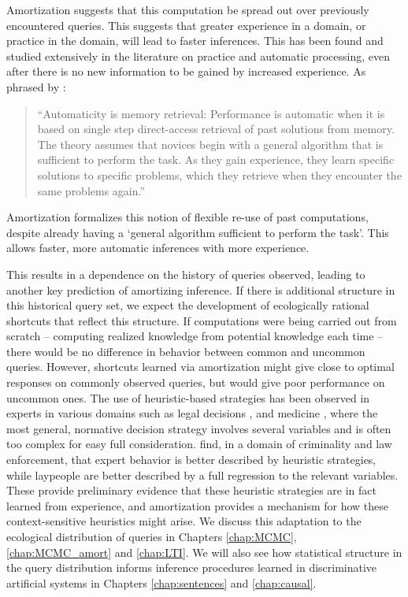 Amortization suggests that this computation be spread out over previously encountered queries. This suggests that greater experience in a domain, or practice in the domain, will lead to faster inferences. This has been found and studied extensively in the literature on practice\citep{gobet2001chunking, newell1981mechanisms} and automatic processing\citep{shiffrin1977controlled, logan1988toward}, even after there is no new information to be gained by increased experience. As phrased by \citet{logan1988toward}:
\begin{quote}
``Automaticity is memory retrieval: Performance is automatic when it is based on single step direct-access retrieval of past solutions from memory. The theory assumes that novices begin with a general algorithm that is sufficient to perform the task. As they gain experience, they learn specific solutions to specific problems, which they retrieve when they encounter the same problems again.''
\end{quote}
Amortization formalizes this notion of flexible re-use of past computations, despite already having a `general algorithm sufficient to perform the task'. This allows faster, more automatic inferences with more experience.

This results in a dependence on the history of queries observed, leading to another key prediction of amortizing inference. If there is additional structure in this historical query set, we expect the development of ecologically rational shortcuts that reflect this structure.  If computations were being carried out from scratch -- computing realized knowledge from potential knowledge each time -- there would be no difference in behavior between common and uncommon queries. However, shortcuts learned via amortization might give close to optimal responses on commonly observed queries, but would give poor performance on uncommon ones. The use of heuristic-based strategies has been observed in experts in various domains such as legal decisions \citep{dhami2001bailing}, and medicine \citep{reyna2006physician}, where the most general, normative decision strategy involves several variables and is often too complex for easy full consideration. \citet{garcia2009take} find, in a domain of criminality and law enforcement, that expert behavior is better described by heuristic strategies, while laypeople are better described by a full regression to the relevant variables. These provide preliminary evidence that these heuristic strategies are in fact learned from experience, and amortization provides a mechanism for how these context-sensitive heuristics might arise. We discuss this adaptation to the ecological distribution of queries in Chapters \ref{chap:MCMC}, \ref{chap:MCMC_amort} and \ref{chap:LTI}. We will also see how statistical structure in the query distribution informs inference procedures learned in discriminative artificial systems in Chapters \ref{chap:sentences} and \ref{chap:causal}. 

